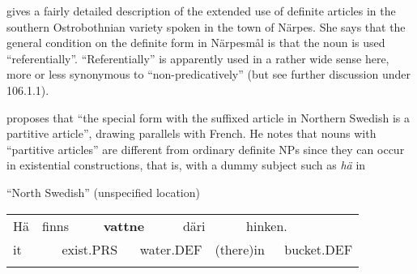 \begin{styleBodytextC}
\citet{Nikula1997} gives a fairly detailed description of the extended use of definite articles in the southern Ostrobothnian variety spoken in the town of Närpes. She says that the general condition on the definite form in Närpesmål is that the noun is used “referentially”. “Referentially” is apparently used in a rather wide sense here, more or less synonymous to “non-predicatively” (but see further discussion under 106.1.1). 

\end{styleBodytextC}

\begin{styleBodytextC}
\citet[50]{Delsing1993} proposes that “the special form with the suffixed article in Northern Swedish is a partitive article”, drawing parallels with French. He notes that nouns with “partitive articles” are different from ordinary definite NPs since they can occur in existential constructions, that is, with a dummy subject such as \textit{hä} in 

\end{styleBodytextC}

\begin{listWWNumileveli}
\item {}

\begin{styleExample}
“North Swedish” (unspecified location)

\end{styleExample}

\end{listWWNumileveli}

\begin{tabular}{llllllllll}
\lsptoprule
Hä & \multicolumn{2}{l}{finns

} & \multicolumn{2}{l}{{\bfseries vattne}

} & \multicolumn{2}{l}{däri

} & \multicolumn{2}{l}{hinken.

} & \\
\multicolumn{2}{l}{it

} & \multicolumn{2}{l}{exist.PRS

} & \multicolumn{2}{l}{water.DEF

} & \multicolumn{2}{l}{(there)in

} & \multicolumn{2}{l}{bucket.DEF

}\\
\lspbottomrule
\end{tabular}

